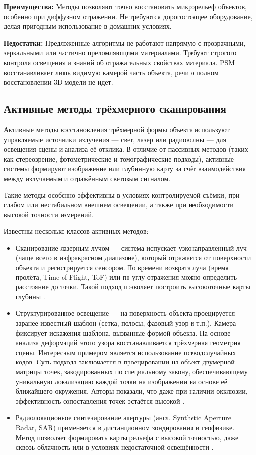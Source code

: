 \textbf{Преимущества:} Методы позволяют точно восстановить микрорельеф объектов,
особенно при диффузном отражении. Не требуются дорогостоящее оборудование,
делая пригодным использование в домашних условиях.

\textbf{Недостатки:} Предложенные алгоритмы не работают напрямую с прозрачными,
зеркальными или частично преломляющими материалами. Требуют строгого контроля
освещения и знаний об отражательных свойствах материала. PSM восстанавливает
лишь видимую камерой часть объекта, речи о полном восстановлении 3D модели не идет.

\subsection{Активные методы трёхмерного сканирования}

Активные методы восстановления трёхмерной формы объекта используют управляемые
источники излучения — свет, лазер или радиоволны — для освещения сцены и анализа
её отклика. В отличие от пассивных методов (таких как стереозрение,
фотометрические и томографические подходы), активные системы формируют
изображение или глубинную карту за счёт взаимодействия между излучаемым и
отражённым световым сигналом.

Такие методы особенно эффективны в условиях контролируемой съёмки, при слабом
или нестабильном внешнем освещении, а также при необходимости высокой точности
измерений.

Известны несколько классов активных методов:

\begin{itemize}
	\item Сканирование лазерным лучом — система испускает узконаправленный луч
	(чаще всего в инфракрасном диапазоне), который отражается от поверхности
	объекта и регистрируется сенсором. По времени возврата луча (время
	пролёта, Time-of-Flight, ToF) или по углу отражения можно определить
	расстояние до точки. Такой подход позволяет построить высокоточные карты
	глубины \cite{10.1109/CVPR.2010.5540082}.
	\item Структурированное освещение — на поверхность объекта проецируется
	заранее известный шаблон (сетка, полосы, фазовый узор и т.п.). Камера
	фиксирует искажения шаблона, вызванные формой объекта. На основе анализа
	деформаций этого узора восстанавливается трёхмерная геометрия сцены. Интересным
	примером является использование псеводслучайных кодов. Суть подхода
	заключается в проецировании на объект двумерной матрицы точек, закодированных
	по специальному закону, обеспечивающему уникальную локализацию каждой точки на
	изображении на основе её ближайшего окружения. Авторы показали, что даже при наличии
	окклюзии, эффективность сопоставления точек остаётся высокой \cite{10.1109/34.667888}.
	\item Радиолокационное синтезирование апертуры (англ. Synthetic Aperture
	Radar, SAR) применяется в дистанционном зондировании и геофизике. Метод
	позволяет формировать карты рельефа с высокой точностью, даже сквозь
	облачность или в условиях недостаточной освещённости \cite{Antipov1988}.
\end{itemize}

